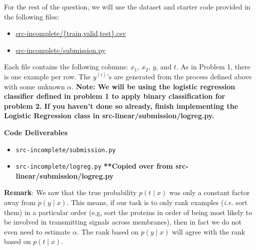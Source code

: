 For the rest of the question, we will use the dataset and starter code provided in
the following files:
%
\begin{center}
\begin{itemize}
\item	\url{src-incomplete/{train,valid,test}.csv}
\item   \url{src-incomplete/submission.py}
\end{itemize}
\end{center}
%
Each file contains the following columns: $x_1$, $x_2$, $y$, and $t$. As in
Problem 1, there is one example per row. The $y^{(i)}$'s are generated from the process defined above with some unknown $\alpha$.
\textbf{Note: We will be using the logistic regression classifier defined in problem 1 to apply binary classification for problem 2. If you haven't done so already, finish implementing the Logistic Regression class in src-linear/submission/logreg.py.}

\textbf{Code Deliverables}
\begin{itemize}
    \item \texttt{src-incomplete/submission.py}
    \item \texttt{src-incomplete/logreg.py} \textbf{  **Copied over from src-linear/submission/logreg.py}
\end{itemize}


\begin{enumerate}
    

    

    

    

    

    
\end{enumerate}

\textbf{Remark}: We saw that the true probability $p(t\mid x)$ was only a
constant factor away from $p(y\mid x)$. This means, if our task is to only rank
examples (\emph{i.e.} sort them) in a particular order (e.g, sort the proteins
in order of being most likely to be involved in transmitting signals across
membranes), then in fact we do not even need to estimate $\alpha$. The rank
based on $p(y\mid x)$ will agree with the rank based on $p(t\mid x)$.